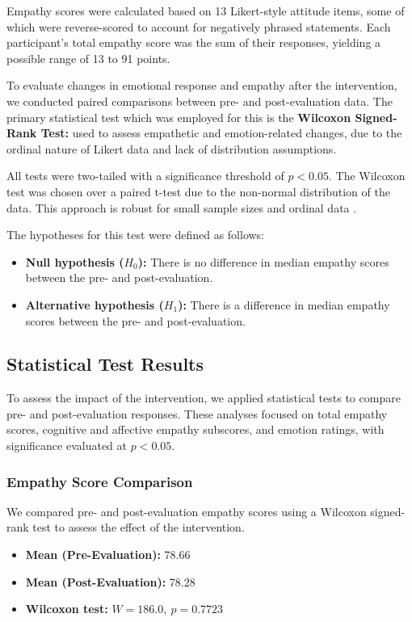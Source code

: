 Empathy scores were calculated based on 13 Likert-style attitude items, some of which were reverse-scored to account for negatively phrased statements. Each participant's total empathy score was the sum of their responses, yielding a possible range of 13 to 91 points.

To evaluate changes in emotional response and empathy after the intervention, we conducted paired comparisons between pre- and post-evaluation data. The primary statistical test which was employed for this is the \textbf{Wilcoxon Signed-Rank Test:} used to assess empathetic and emotion-related changes, due to the ordinal nature of Likert data and lack of distribution assumptions.

All tests were two-tailed with a significance threshold of $p < 0.05$. The Wilcoxon test was chosen over a paired t-test due to the non-normal distribution of the data. This approach is robust for small sample sizes and ordinal data \cite{Wilcoxon2013}.

The hypotheses for this test were defined as follows:

\begin{itemize}
  \item \textbf{Null hypothesis ($H_0$):} There is no difference in median empathy scores between the pre- and post-evaluation.
  \item \textbf{Alternative hypothesis ($H_1$):} There is a difference in median empathy scores between the pre- and post-evaluation.
\end{itemize}


\subsection{Statistical Test Results}

To assess the impact of the intervention, we applied statistical tests to compare pre- and post-evaluation responses. These analyses focused on total empathy scores, cognitive and affective empathy subscores, and emotion ratings, with significance evaluated at $p < 0.05$.


\subsubsection{Empathy Score Comparison}

We compared pre- and post-evaluation empathy scores using a Wilcoxon signed-rank test to assess the effect of the intervention.

\begin{itemize}
  \item \textbf{Mean (Pre-Evaluation):} 78.66
  \item \textbf{Mean (Post-Evaluation):} 78.28
  \item \textbf{Wilcoxon test:} $W = 186.0,\ p = 0.7723$
\end{itemize}

